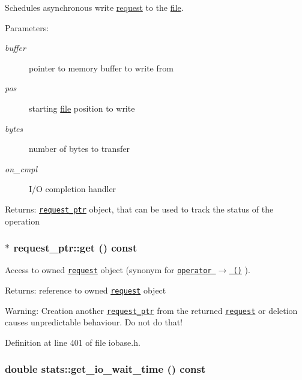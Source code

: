 Schedules asynchronous write \hyperlink{classrequest}{request} to the \hyperlink{classfile}{file}. 

\begin{Desc}
\item[Parameters:]
\begin{description}
\item[{\em buffer}]pointer to memory buffer to write from \item[{\em pos}]starting \hyperlink{classfile}{file} position to write \item[{\em bytes}]number of bytes to transfer \item[{\em on\_\-cmpl}]I/O completion handler \end{description}
\end{Desc}
\begin{Desc}
\item[Returns:]{\tt \hyperlink{classrequest__ptr}{request\_\-ptr}} object, that can be used to track the status of the operation \end{Desc}
\hypertarget{group__iolayer_g30490f3d014bae40a66022640fb34153}{
\subsubsection[{get}]{$\ast$ request\_\-ptr::get () const}}
\label{group__iolayer_g30490f3d014bae40a66022640fb34153}


Access to owned {\tt \hyperlink{classrequest}{request}} object (synonym for {\tt \hyperlink{group__iolayer_g9ccc7167eaa30948950571a094b9c902}{operator $\rightarrow$ ()}} ). 

\begin{Desc}
\item[Returns:]reference to owned {\tt \hyperlink{classrequest}{request}} object \end{Desc}
\begin{Desc}
\item[Warning:]Creation another {\tt \hyperlink{classrequest__ptr}{request\_\-ptr}} from the returned {\tt \hyperlink{classrequest}{request}} or deletion causes unpredictable behaviour. Do not do that! \end{Desc}


Definition at line 401 of file iobase.h.\hypertarget{group__iolayer_gfb84d41b01e495224d1e0033386ee55c}{
\subsubsection[{get\_\-io\_\-wait\_\-time}]{\setlength{\rightskip}{0pt plus 5cm}double stats::get\_\-io\_\-wait\_\-time () const}}
\label{group__iolayer_gfb84d41b01e495224d1e0033386ee55c}


